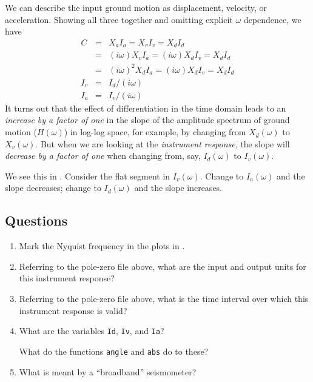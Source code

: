 \documentclass[11pt,titlepage,fleqn]{article}
\begin{document}
\begin{itemize}
We can describe the input ground motion as displacement, velocity, or acceleration. Showing all three together and omitting explicit $\omega$ dependence, we have
%
\begin{eqnarray}
C &=& X_a I_a = X_v I_v =  X_d I_d 
\\
&=& (i\omega) X_v I_a = (i\omega) X_d I_v =  X_d I_d 
\\
&=& (i\omega)^2 X_d I_a = (i\omega) X_d I_v =  X_d I_d 
\\
I_v &=& I_d / (i\omega)
\\
I_a &=& I_v / (i\omega)
\end{eqnarray}
%
It turns out that the effect of differentiation in the time domain leads to an {\em increase by a factor of one} in the slope of the amplitude spectrum of ground motion ($H(\omega)$) in log-log space, for example, by changing from $X_d(\omega)$ to $X_v(\omega)$. But when we are looking at the {\em instrument response}, the slope will {\em decrease by a factor of one} when changing from, say, $I_d(\omega)$ to $I_v(\omega)$.

We see this in . Consider the flat segment in $I_v(\omega)$. Change to $I_a(\omega)$ and the slope decreases; change to $I_d(\omega)$ and the slope increases.

\end{itemize}


\pagebreak
\subsection*{Questions}

\begin{enumerate}
\item Mark the Nyquist frequency in the plots in .

\item Referring to the pole-zero file above, what are the input and output units for this instrument response?

\item Referring to the pole-zero file above, what is the time interval over which this instrument response is valid?

\item What are the variables \verb+Id+, \verb+Iv+, and \verb+Ia+?

What do the functions \verb+angle+ and \verb+abs+ do to these?

\item What is meant by a ``broadband'' seismometer?
\end{enumerate}
\end{document}
